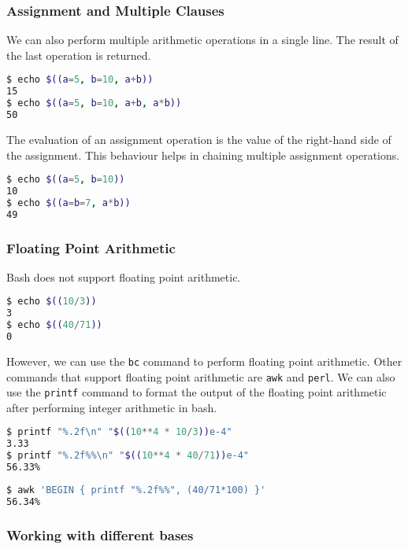 \subsubsection{Assignment and Multiple Clauses}

We can also perform multiple arithmetic operations in a single line. The result of the last operation is returned.

\begin{lstlisting}[language=bash]
$ echo $((a=5, b=10, a+b))
15
$ echo $((a=5, b=10, a+b, a*b))
50
\end{lstlisting}

The evaluation of an assignment operation is the value of the right-hand side of the assignment.
This behaviour helps in chaining multiple assignment operations.

\begin{lstlisting}[language=bash]
$ echo $((a=5, b=10))
10
$ echo $((a=b=7, a*b))
49
\end{lstlisting}

\subsubsection{Floating Point Arithmetic}
Bash does not support floating point arithmetic.

\begin{lstlisting}[language=bash]
$ echo $((10/3))
3
$ echo $((40/71))
0
\end{lstlisting}

However, we can use the \lstinline{bc} command to perform floating point arithmetic.
Other commands that support floating point arithmetic are \lstinline{awk} and \lstinline{perl}.
We can also use the \lstinline{printf} command to format the output of the floating point arithmetic after performing integer arithmetic in bash.

\begin{lstlisting}[language=bash]
$ printf "%.2f\n" "$((10**4 * 10/3))e-4"
3.33
$ printf "%.2f%%\n" "$((10**4 * 40/71))e-4"
56.33%
\end{lstlisting}

\begin{lstlisting}[language=bash]
$ awk 'BEGIN { printf "%.2f%%", (40/71*100) }'
56.34%
\end{lstlisting}

\subsubsection{Working with different bases}

